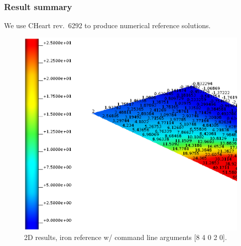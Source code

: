 \subsubsection{Result summary}
%
We use CHeart rev.\ 6292 to produce numerical reference solutions.
%


%
\begin{figure}[h!]
    \centering 
    \includegraphics[width=0.9\columnwidth]{examples/example-0004/doc/figures/iron_reference_2D.eps} 
    \caption{2D results, iron reference w/ command line arguments [8 4 0 2 0].}
    \label{example-0004-iron-2D-reference-fig}
\end{figure}
%

